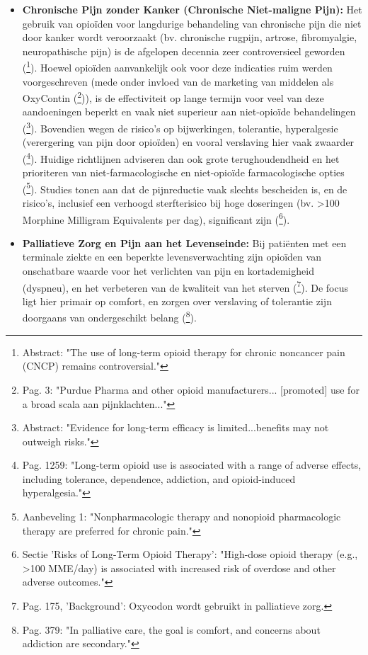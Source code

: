 \documentclass[11pt, a4paper]{report} %
\begin{document}
\begin{itemize}
    \item \textbf{Chronische Pijn zonder Kanker (Chronische Niet-maligne Pijn):} Het gebruik van opioïden voor langdurige behandeling van chronische pijn die niet door kanker wordt veroorzaakt (bv. chronische rugpijn, artrose, fibromyalgie, neuropathische pijn) is de afgelopen decennia zeer controversieel geworden (\cite{Hooten2021OpioidsChronicPain}\footnote{Abstract: "The use of long-term opioid therapy for chronic noncancer pain (CNCP) remains controversial."}). Hoewel opioïden aanvankelijk ook voor deze indicaties ruim werden voorgeschreven (mede onder invloed van de marketing van middelen als OxyContin (\cite{Maclean2020EconomicStudiesOpioid}\footnote{Pag. 3: "Purdue Pharma and other opioid manufacturers... [promoted] use for a broad scala aan pijnklachten..."})), is de effectiviteit op lange termijn voor veel van deze aandoeningen beperkt en vaak niet superieur aan niet-opioïde behandelingen (\cite{Kalso2004OpioidsChronicNonCancerPain}\footnote{Abstract: "Evidence for long-term efficacy is limited...benefits may not outweigh risks."}). Bovendien wegen de risico's op bijwerkingen, tolerantie, hyperalgesie (verergering van pijn door opioïden) en vooral verslaving hier vaak zwaarder (\cite{Volkow2016OpioidAbuseChronicPain}\footnote{Pag. 1259: "Long-term opioid use is associated with a range of adverse effects, including tolerance, dependence, addiction, and opioid-induced hyperalgesia."}). Huidige richtlijnen adviseren dan ook grote terughoudendheid en het prioriteren van niet-farmacologische en niet-opioïde farmacologische opties (\cite{Dowell2016CDCGuideline}\footnote{Aanbeveling 1: "Nonpharmacologic therapy and nonopioid pharmacologic therapy are preferred for chronic pain."}). Studies tonen aan dat de pijnreductie vaak slechts bescheiden is, en de risico's, inclusief een verhoogd sterfterisico bij hoge doseringen (bv. >100 Morphine Milligram Equivalents per dag), significant zijn (\cite{Hooten2021OpioidsChronicPain}\footnote{Sectie 'Risks of Long-Term Opioid Therapy': "High-dose opioid therapy (e.g., >100 MME/day) is associated with increased risk of overdose and other adverse outcomes."}).
    \item \textbf{Palliatieve Zorg en Pijn aan het Levenseinde:} Bij patiënten met een terminale ziekte en een beperkte levensverwachting zijn opioïden van onschatbare waarde voor het verlichten van pijn en kortademigheid (dyspneu), en het verbeteren van de kwaliteit van het sterven (\cite{Riley2008OxycodoneReview}\footnote{Pag. 175, 'Background': Oxycodon wordt gebruikt in palliatieve zorg.}). De focus ligt hier primair op comfort, en zorgen over verslaving of tolerantie zijn doorgaans van ondergeschikt belang (\cite{Kalso2004OpioidsChronicNonCancerPain}\footnote{Pag. 379: "In palliative care, the goal is comfort, and concerns about addiction are secondary."}).

\end{itemize}
\end{document}
